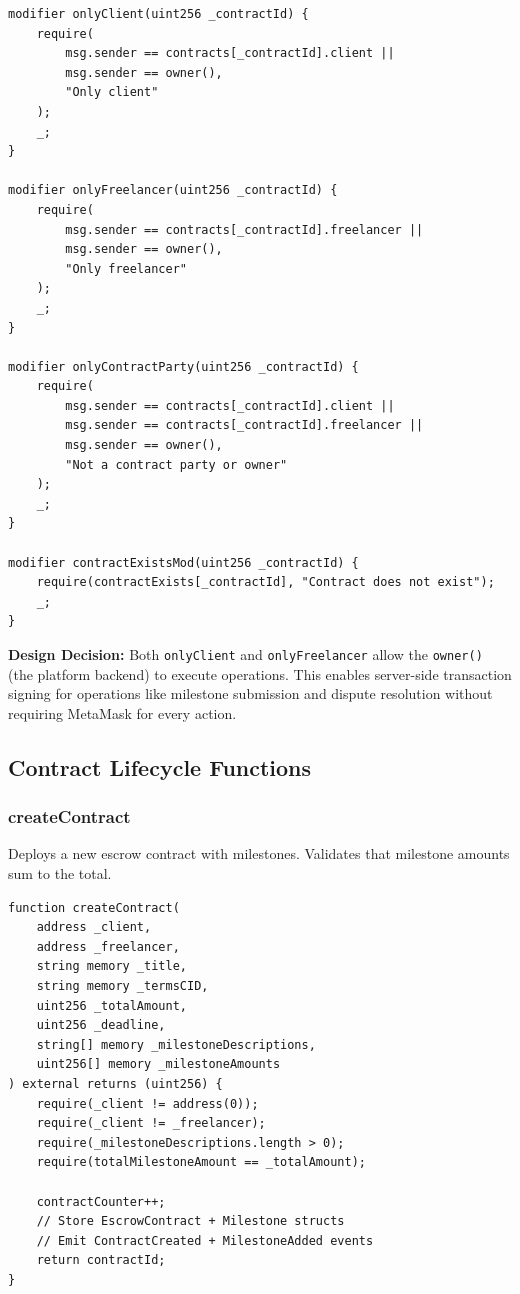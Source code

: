 \documentclass[12pt,a4paper]{article}
\begin{document}
\begin{lstlisting}[style=soliditystyle]
modifier onlyClient(uint256 _contractId) {
    require(
        msg.sender == contracts[_contractId].client ||
        msg.sender == owner(),
        "Only client"
    );
    _;
}

modifier onlyFreelancer(uint256 _contractId) {
    require(
        msg.sender == contracts[_contractId].freelancer ||
        msg.sender == owner(),
        "Only freelancer"
    );
    _;
}

modifier onlyContractParty(uint256 _contractId) {
    require(
        msg.sender == contracts[_contractId].client ||
        msg.sender == contracts[_contractId].freelancer ||
        msg.sender == owner(),
        "Not a contract party or owner"
    );
    _;
}

modifier contractExistsMod(uint256 _contractId) {
    require(contractExists[_contractId], "Contract does not exist");
    _;
}
\end{lstlisting}

\textbf{Design Decision:} Both \texttt{onlyClient} and \texttt{onlyFreelancer} allow the \texttt{owner()} (the platform backend) to execute operations. This enables server-side transaction signing for operations like milestone submission and dispute resolution without requiring MetaMask for every action.

\subsection{Contract Lifecycle Functions}

\subsubsection{createContract}
Deploys a new escrow contract with milestones. Validates that milestone amounts sum to the total.

\begin{lstlisting}[style=soliditystyle]
function createContract(
    address _client,
    address _freelancer,
    string memory _title,
    string memory _termsCID,
    uint256 _totalAmount,
    uint256 _deadline,
    string[] memory _milestoneDescriptions,
    uint256[] memory _milestoneAmounts
) external returns (uint256) {
    require(_client != address(0));
    require(_client != _freelancer);
    require(_milestoneDescriptions.length > 0);
    require(totalMilestoneAmount == _totalAmount);

    contractCounter++;
    // Store EscrowContract + Milestone structs
    // Emit ContractCreated + MilestoneAdded events
    return contractId;
}
\end{lstlisting}
\end{document}
